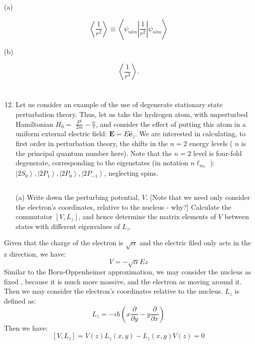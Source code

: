 \documentclass[12pt]{article}
\begin{document}
(a)

$$
\left\langle\frac{1}{r^{2}}\right\rangle \equiv\left\langle\psi_{n l m}\left|\frac{1}{r^{2}}\right| \psi_{n l m}\right\rangle
$$

(b)

$$
\left\langle\frac{1}{r^{3}}\right\rangle .
$$
\section{}
\begin{enumerate}
  \setcounter{enumi}{11}
  \item Let us consider an example of the use of degenerate stationary state perturbation theory. Thus, let us take the hydrogen atom, with unperturbed Hamiltonian $H_{0}=$ $\frac{P^{2}}{2 m}-\frac{\alpha}{r}$, and consider the effect of putting this atom in a uniform external electric field: $\mathbf{E}=E \hat{\mathbf{e}}_{z}$. We are interested in calculating, to first order in perturbation theory, the shifts in the $n=2$ energy levels ( $n$ is the principal quantum number here). Note that the $n=2$ level is four-fold degenerate, corresponding to the eigenstates (in notation $n \ell_{m_{\ell}}$ ): $\left|2 S_{0}\right\rangle,\left|2 P_{1}\right\rangle,\left|2 P_{0}\right\rangle,\left|2 P_{-1}\right\rangle$, neglecting spins.
\subsection{}
(a) Write down the perturbing potential, $V$. [Note that we need only consider the electron's coordinates, relative to the nucleus - why?] Calculate the commutator $\left[V, L_{z}\right]$, and hence determine the matrix elements of $V$ between states with different eigenvalues of $L_{z}$.
\end{enumerate}
Given that the charge of the electron is $\sqrt{\alpha }$ and the electric filed only acts in the z direction, we have:
\begin{equation}
  V = -\sqrt{\alpha} E z
\end{equation}
Similar to the Born-Oppenheimer approximation, we may consider the nucleus as fixed , because it is much more massive, and the electron as moving around it. Then we may consider the electron's coordinates relative to the nucleus. $L_z$ is defined as:
\begin{equation}
  L_z = -i\hbar \left( x \frac{\partial}{\partial y} - y \frac{\partial}{\partial x} \right)
\end{equation}
Then we have:
\begin{equation}
  \left[V, L_{z}\right] = V(z)L_z(x,y) - L_z(x,y)V(z) = 0
\end{equation}
\end{document}
